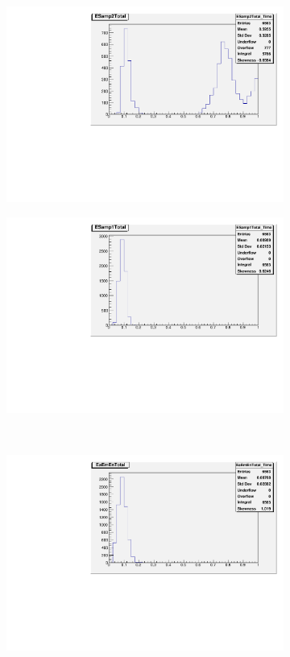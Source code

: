 \begin{figure}[ht]
\begin{subfigure}[c]{.48\textwidth}
\includegraphics[width=\textwidth]{appendices/figures/fastcalo_time/samp2.pdf}
\centering
\end{subfigure}
\begin{subfigure}[c]{.48\textwidth}
\includegraphics[width=\textwidth]{appendices/figures/fastcalo_time/samp1.pdf}
\centering
\end{subfigure} \\
\begin{subfigure}[c]{.48\textwidth}
\includegraphics[width=\textwidth]{appendices/figures/fastcalo_time/ementotal.pdf}

\end{subfigure}
\end{figure}
